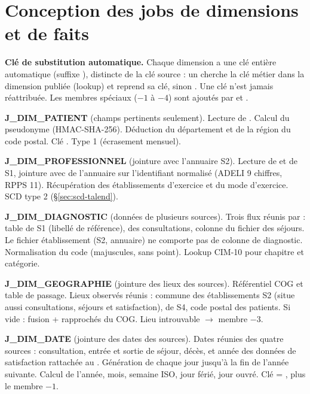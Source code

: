 \section{Conception des jobs de dimensions et de faits}\label{sec:jobs-detail}

\textbf{Clé de substitution automatique.} Chaque dimension a une clé entière automatique (suffixe ), distincte de la clé source : un  cherche la clé métier dans la dimension publiée (lookup) et reprend sa clé, sinon . Une clé n'est jamais réattribuée. Les membres spéciaux ($-1$ à $-4$) sont ajoutés par  et .

\textbf{J\_DIM\_PATIENT} (champs pertinents seulement). Lecture de . Calcul du pseudonyme  (HMAC-SHA-256). Déduction du département et de la région du code postal. Clé . Type 1 (écrasement mensuel).

\textbf{J\_DIM\_PROFESSIONNEL} (jointure avec l'annuaire S2). Lecture de  et  de S1, jointure avec  de l'annuaire sur l'identifiant normalisé (ADELI 9 chiffres, RPPS 11). Récupération des établissements d'exercice et du mode d'exercice. SCD type 2 (§\ref{sec:scd-talend}).

\textbf{J\_DIM\_DIAGNOSTIC} (données de plusieurs sources). Trois flux réunis par  : table  de S1 (libellé de référence),  des consultations, colonne  du fichier des séjours. Le fichier établissement (S2, annuaire) ne comporte pas de colonne de diagnostic. Normalisation du code (majuscules, sans point). Lookup CIM-10 pour chapitre et catégorie.

\textbf{J\_DIM\_GEOGRAPHIE} (jointure des lieux des sources). Référentiel COG et table de passage. Lieux observés réunis : commune des établissements S2 (situe aussi consultations, séjours et satisfaction),  de S4, code postal des patients. Si  vide : fusion  +  rapprochés du COG. Lieu introuvable $\rightarrow$ membre $-3$.

\textbf{J\_DIM\_DATE} (jointure des dates des sources). Dates réunies des quatre sources : consultation, entrée et sortie de séjour, décès, et année des données de satisfaction rattachée au . Génération de chaque jour jusqu'à la fin de l'année suivante. Calcul de l'année, mois, semaine ISO, jour férié, jour ouvré. Clé  = , plus le membre $-1$.

